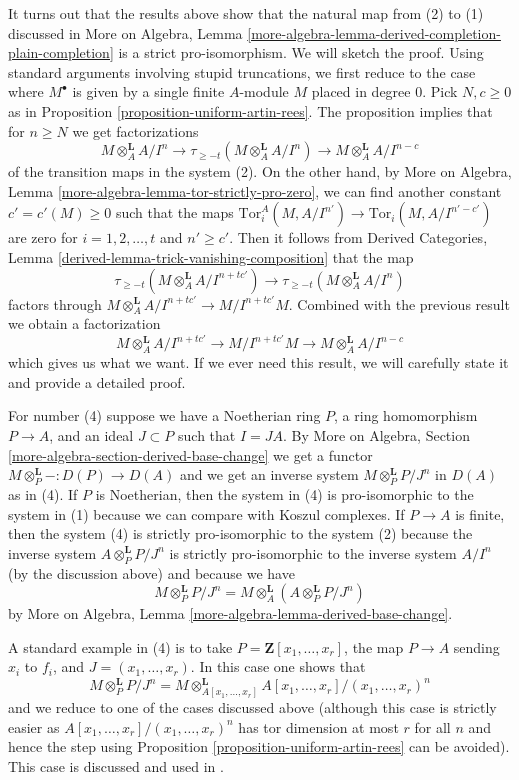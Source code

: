 \begin{remark}
\medskip\noindent
It turns out that the results above show that the natural map from
(2) to (1) discussed in More on Algebra, Lemma
\ref{more-algebra-lemma-derived-completion-plain-completion}
is a strict pro-isomorphism. We will sketch the proof.
Using standard arguments involving stupid truncations, we first reduce
to the case where $M^\bullet$ is given by a single finite $A$-module
$M$ placed in degree $0$. Pick $N, c \geq 0$ as in
Proposition \ref{proposition-uniform-artin-rees}.
The proposition implies that for $n \geq N$ we get factorizations
$$
M \otimes_A^\mathbf{L} A/I^n
\to
\tau_{\geq -t}(M \otimes_A^\mathbf{L} A/I^n)
\to
M \otimes_A^\mathbf{L} A/I^{n - c}
$$
of the transition maps in the system (2). On the other hand, by
More on Algebra, Lemma \ref{more-algebra-lemma-tor-strictly-pro-zero},
we can find another constant $c' = c'(M) \geq 0$ such that the maps
$\text{Tor}_i^A(M, A/I^{n'}) \to \text{Tor}_i(M, A/I^{n' - c'})$
are zero for $i = 1, 2, \ldots, t$ and $n' \geq c'$. Then it follows from
Derived Categories, Lemma \ref{derived-lemma-trick-vanishing-composition}
that the map
$$
\tau_{\geq -t}(M \otimes_A^\mathbf{L} A/I^{n + tc'})
\to
\tau_{\geq -t}(M \otimes_A^\mathbf{L} A/I^n)
$$
factors through $M \otimes_A^\mathbf{L}A/I^{n + tc'} \to M/I^{n + tc'}M$.
Combined with the previous result we obtain a factorization
$$
M \otimes_A^\mathbf{L}A/I^{n + tc'} \to M/I^{n + tc'}M
\to M \otimes_A^\mathbf{L} A/I^{n - c}
$$
which gives us what we want. If we ever need this result, we will carefully
state it and provide a detailed proof.

\medskip\noindent
For number (4) suppose we have a Noetherian ring $P$,
a ring homomorphism $P \to A$, and an ideal $J \subset P$ such that $I = JA$.
By More on Algebra, Section \ref{more-algebra-section-derived-base-change}
we get a functor $M \otimes_P^\mathbf{L} - : D(P) \to D(A)$ and we get
an inverse system $M \otimes_P^\mathbf{L} P/J^n$ in $D(A)$ as in (4).
If $P$ is Noetherian, then the system in (4) is pro-isomorphic
to the system in (1) because we can compare with Koszul complexes.
If $P \to A$ is finite, then the system (4) is strictly pro-isomorphic
to the system (2) because the inverse system $A \otimes_P^\mathbf{L} P/J^n$
is strictly pro-isomorphic to the inverse system $A/I^n$
(by the discussion above) and because we have
$$
M \otimes_P^\mathbf{L} P/J^n = M \otimes_A^\mathbf{L}
(A \otimes_P^\mathbf{L} P/J^n)
$$
by More on Algebra, Lemma \ref{more-algebra-lemma-derived-base-change}.

\medskip\noindent
A standard example in (4) is to take $P = \mathbf{Z}[x_1, \ldots, x_r]$,
the map $P \to A$ sending $x_i$ to $f_i$, and $J = (x_1, \ldots, x_r)$.
In this case one shows that
$$
M \otimes_P^\mathbf{L} P/J^n =
M \otimes_{A[x_1, \ldots, x_r]}^\mathbf{L}
A[x_1, \ldots, x_r]/(x_1, \ldots, x_r)^n
$$
and we reduce to one of the cases discussed above (although this case
is strictly easier as $A[x_1, \ldots, x_r]/(x_1, \ldots, x_r)^n$ has
tor dimension at most $r$ for all $n$ and hence the step using
Proposition \ref{proposition-uniform-artin-rees} can be avoided).
This case is discussed and used in \cite[Proposition 3.5.1]{BS}.
\end{remark}
